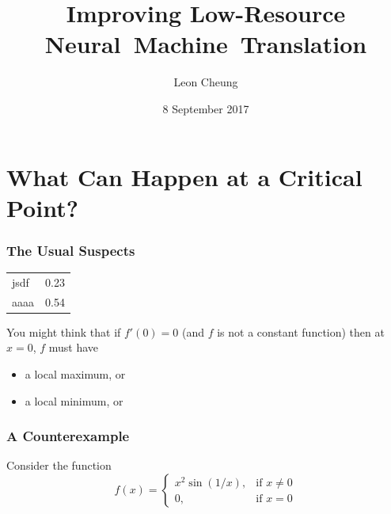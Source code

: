\documentclass{beamer}
\title{Improving Low-Resource Neural~Machine~Translation}
\author{Leon Cheung}
\institute{University of California San Diego}
\date{8 September 2017} %
\theoremstyle{definition}
\begin{document}
{
\begin{frame} 
\titlepage
\end{frame}
}

\section{What Can Happen at a Critical Point?} 

\begin{frame} 
\frametitle{The Usual Suspects}

\begin{center}
\begin{tabular}{l | r}
    \hline
    jsdf & 0.23 \\
    aaaa & 0.54
\end{tabular}
\end{center}

You might think that if $f'(0)=0$ (and $f$ is not a constant function) then at 
$x=0$, $f$ must have
\begin{itemize}
\pause \item a local maximum, or 
\pause \item a local minimum, or
\end{itemize}  
\end{frame}

\begin{frame}
\frametitle{A Counterexample}
\alert{Consider} the function 
\[ 
    f(x)=
\begin{cases} 
x^2\sin(1/x), &\text{if }x\neq0 \\
0, &\text{if }x=0
\end{cases}
\]
\end{frame}
\end{document}
